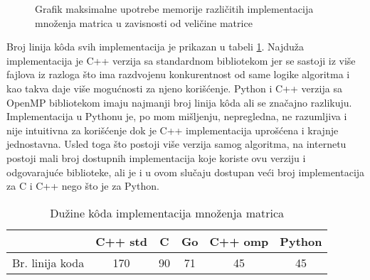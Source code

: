 \documentclass[12pt,oneside]{memoir}
\begin{document}
\begin{figure}
\begin{center}


\caption{Grafik maksimalne upotrebe memorije različitih implementacija množenja matrica u zavisnosti od veličine matrice}
\label{fig:matrix2}
\end{center}
\end{figure}

Broj linija k\^{o}da svih  implementacija je prikazan u tabeli \ref{tab:matrix1}. Najduža implementacija je C++ verzija sa standardnom bibliotekom jer se sastoji iz više fajlova iz razloga što ima razdvojenu konkurentnost od same logike algoritma i kao takva daje više mogućnosti za njeno korišćenje. Python i C++ verzija sa OpenMP bibliotekom imaju najmanji broj linija  k\^{o}da ali se značajno razlikuju. Implementacija u Pythonu je, po mom mišljenju, nepregledna, ne razumljiva i nije intuitivna za korišćenje dok je C++ implementacija uprošćena i krajnje jednostavna. Usled toga što postoji više verzija samog algoritma, na internetu postoji mali broj dostupnih implementacija koje koriste ovu verziju i odgovarajuće biblioteke, ali je i u ovom slučaju dostupan veći broj implementacija za C i C++ nego što je za Python.
 
\begin{table}
\begin{center}
\caption{Dužine k\^{o}da implementacija množenja matrica}
\begin{tabular}{|c|c|c|c|c|c|}
\hline
		& C++ std	&  C 	& Go	& C++ omp	& Python	\\ \hline
Br. linija koda&170		& 90	& 71	&45		&45		\\ \hline
\end{tabular}
\label{tab:matrix1}
\end{center}
\end{table}
\end{document}
